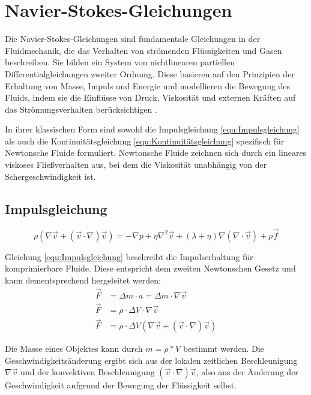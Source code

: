\documentclass[a4paper, 12pt]{article}
\begin{document}
\section{Navier-Stokes-Gleichungen} \label{Kap:NavierStrokes}
Die Navier-Stokes-Gleichungen sind fundamentale Gleichungen in der Fluidmechanik, die das Verhalten von strömenden Flüssigkeiten und Gasen beschreiben. Sie bilden ein System von nichtlinearen partiellen Differentialgleichungen zweiter Ordnung. Diese basieren auf den Prinzipien der Erhaltung von Masse, Impuls und Energie und modellieren die Bewegung des Fluids, indem sie die Einflüsse von Druck, Viskosität und externen Kräften auf das Strömungsverhalten berücksichtigen \cite{studyflix_navierstokes}.

In ihrer klassischen Form sind sowohl die Impulsgleichung \eqref{equ:Impulsgleichung} als auch die Kontinuitätsgleichung \eqref{equ:Kontinuitätsgleichung} spezifisch für Newtonsche Fluide formuliert. Newtonsche Fluide zeichnen sich durch ein lineares viskoses Fließverhalten aus, bei dem die Viskosität unabhängig von der Schergeschwindigkeit ist.

\subsection{Impulsgleichung}
\begin{equation} \label{equ:Impulsgleichung}
	\rho(\nabla \vec{v} + (\vec{v} \cdot \nabla)\vec{v}) = - \nabla p + \eta \nabla^2 \vec{v} + (\lambda + \eta)\nabla(\nabla \cdot \vec{v}) + \rho \vec{f}
\end{equation}

Gleichung \eqref{equ:Impulsgleichung} beschreibt die Impulserhaltung für komprimierbare Fluide. Diese entspricht dem zweiten Newtonschen Gesetz und kann dementsprechend hergeleitet werden:
\begin{align}
	\vec{F} & =\Delta m \cdot a = \Delta m \cdot \nabla \vec{v} \nonumber                 \\
	\vec{F} & =\rho \cdot \Delta V \cdot \nabla \vec{v} \nonumber                         \\
	\vec{F} & =\rho \cdot \Delta V (\nabla \vec{v} + (\vec{v} \cdot \nabla)\vec{v})
	\label{equ:Newtonsches_Gesetz}
\end{align}

Die Masse eines Objektes kann durch $m = \rho * V$ bestimmt werden. Die Geschwindigkeitsänderung ergibt sich aus der lokalen zeitlichen Beschleunigung $\nabla \vec{v}$ und der konvektiven Beschleunigung $(\vec{v} \cdot \nabla)\vec{v}$, also aus der Änderung der Geschwindigkeit aufgrund der Bewegung der Flüssigkeit selbst.
\end{document}
